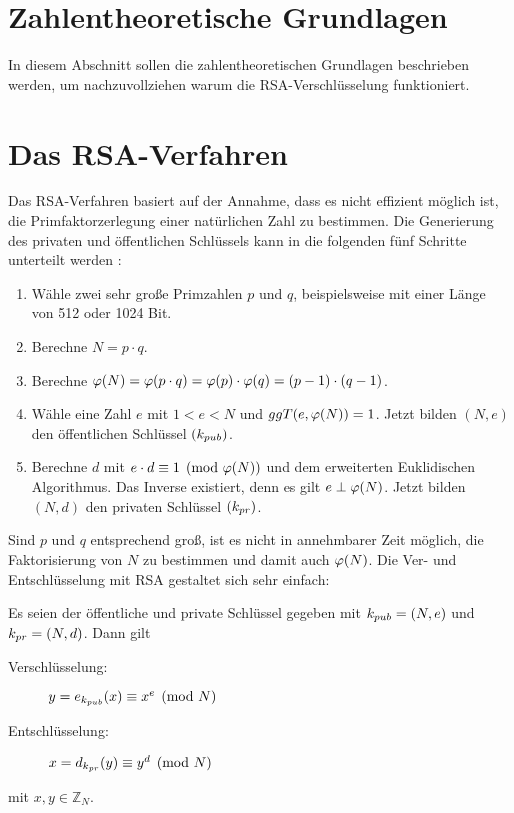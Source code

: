 \section{Zahlentheoretische Grundlagen}
In diesem Abschnitt sollen die zahlentheoretischen Grundlagen beschrieben werden,
um nachzuvollziehen warum die RSA-Verschlüsselung funktioniert.







\section{Das RSA-Verfahren}
Das RSA-Verfahren basiert auf der Annahme, dass es nicht effizient
möglich ist, die Primfaktorzerlegung einer natürlichen Zahl zu bestimmen.
Die Generierung des privaten und öffentlichen Schlüssels kann in die
folgenden fünf Schritte unterteilt werden \parencite[176]{BOOK:crypto}:
\newpage
\begin{definition}\mbox{}
  \begin{enumerate}
    \item Wähle zwei sehr große Primzahlen $p$ und $q$, beispielsweise mit einer Länge
          von 512 oder 1024 Bit.
    \item Berechne $N = p \cdot q$.
    \item Berechne $\varphi(N) = \varphi(p \cdot q) = \varphi(p) \cdot \varphi(q) = (p-1) \cdot (q-1)$.
    \item Wähle eine Zahl $e$ mit $1 < e < N$ und $ggT(e,\varphi(N)) = 1$. Jetzt bilden
          $(N,e)$ den öffentlichen Schlüssel $(k_{pub})$.
    \item Berechne $d$ mit $e \cdot d \equiv 1 \pmod{\varphi(N)}$ und dem erweiterten
          Euklidischen Algorithmus. Das Inverse existiert, denn es gilt $e \perp \varphi(N)$.
          Jetzt bilden $(N,d)$ den privaten Schlüssel $(k_{pr})$.
  \end{enumerate}
\end{definition}

\noindent
Sind $p$ und $q$ entsprechend groß, ist es nicht in annehmbarer Zeit möglich, die Faktorisierung
von $N$ zu bestimmen und damit auch $\varphi(N)$. Die Ver- und Entschlüsselung mit RSA
gestaltet sich sehr einfach:

\begin{definition}
  Es seien der öffentliche und private Schlüssel gegeben mit
  $k_{pub} = (N,e)$ und $k_{pr} = (N,d)$. Dann gilt
  \begin{description}
    \item[Verschlüsselung:] $y = e_{k_{pub}}(x) \equiv x^e \pmod{N}$
    \item[Entschlüsselung:] $x = d_{k_{pr}}(y) \equiv y^d \pmod{N}$
  \end{description}
  mit $x,y \in \mathbb{Z}_N$.
\end{definition}

